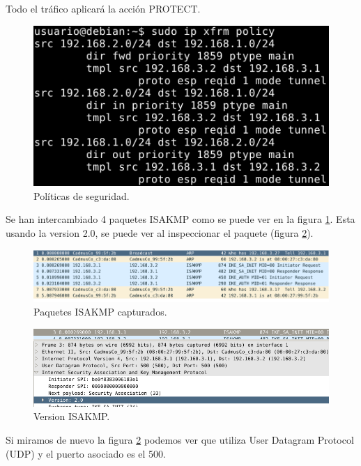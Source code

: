 \documentclass[11pt]{article}
\begin{document}
    \par
    Todo el tráfico aplicará la acción PROTECT.

    \begin{figure}[H]
      \centering
      \includegraphics[width = .8\textwidth]{policy}
      \caption{Políticas de seguridad.}
    \end{figure}

    \par
    Se han intercambiado 4 paquetes ISAKMP como se puede ver en la figura
    \ref{fig:packisak}. Esta usando la version 2.0, se puede ver al inspeccionar
    el paquete (figura \ref{fig:visak}).

    \begin{figure}[H]
      \centering
      \includegraphics[width = \textwidth]{packisak}
      \caption{Paquetes ISAKMP capturados.}
      \label{fig:packisak}
    \end{figure}

    \begin{figure}[H]
      \centering
      \includegraphics[width = \textwidth]{visak}
      \caption{Version ISAKMP.}
      \label{fig:visak}
    \end{figure}

    \par
    Si miramos de nuevo la figura \ref{fig:visak} podemos ver que utiliza User
    Datagram Protocol (UDP) y el puerto asociado es el 500.
\end{document}
